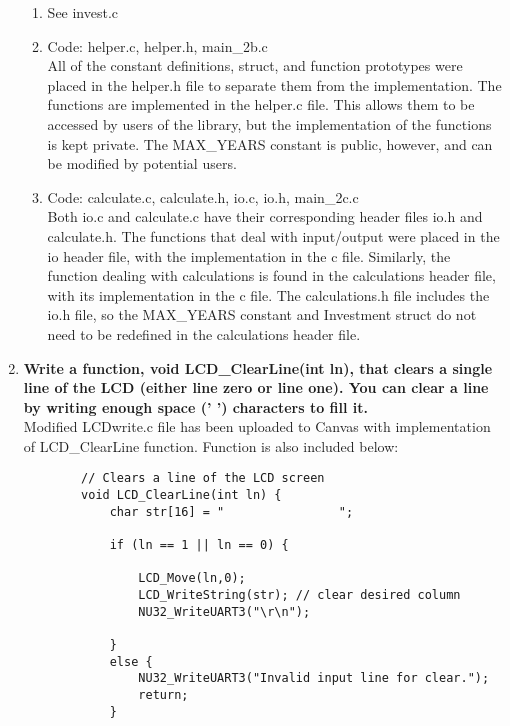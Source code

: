 \documentclass{article}
\begin{document}
\begin{enumerate}[label=\textbf{\arabic*})]
    \begin{enumerate}[label=\textbf{\alph*}.]
        \item See invest.c
        \item Code: helper.c, helper.h, main\_2b.c \\
        
        All of the constant definitions, struct, and function prototypes were placed in the 
        helper.h file to separate them from the implementation. The functions are implemented
        in the helper.c file. This allows them to be accessed by users of the library,
        but the implementation of the functions is kept private. The MAX\_YEARS constant is 
        public, however, and can be modified by potential users. 
        \item Code: calculate.c, calculate.h, io.c, io.h, main\_2c.c \\
        
        Both io.c and calculate.c have their corresponding header files io.h and calculate.h.
        The functions that deal with input/output were placed in the io header file, with the 
        implementation in the c file. Similarly, the function dealing with calculations is 
        found in the calculations header file, with its implementation in the c file. The 
        calculations.h file includes the io.h file, so the MAX\_YEARS constant and Investment
        struct do not need to be redefined in the calculations header file. 
        

    \end{enumerate}

    \setcounter{enumi}{3}
    \item \textbf{Write a function, void LCD\_ClearLine(int ln), that clears a single line of the LCD (either
    line zero or line one). You can clear a line by writing enough space (’ ’) characters to
    fill it.} \\

    Modified LCDwrite.c file has been uploaded to Canvas with implementation of LCD\_ClearLine function. 
    Function is also included below:

    \begin{lstlisting}
        // Clears a line of the LCD screen
        void LCD_ClearLine(int ln) {
            char str[16] = "                ";

            if (ln == 1 || ln == 0) {

                LCD_Move(ln,0);
                LCD_WriteString(str); // clear desired column
                NU32_WriteUART3("\r\n");

            }
            else {
                NU32_WriteUART3("Invalid input line for clear.");
                return;
            }
    \end{lstlisting}


\end{enumerate}
\end{document}

